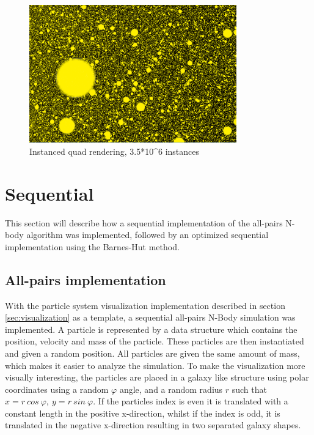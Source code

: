 \begin{figure}[!htpb]
    \centering
    \includegraphics[width=0.8\textwidth]{Method/Figs/OpenGLVis_N=3500000.png}
    \caption{Instanced quad rendering, 3.5*10^6 instances}
    \label{fig:OpenGLEarlyVis}
\end{figure}


\section{Sequential}

This section will describe how a sequential implementation of the all-pairs N-body algorithm was implemented, followed by an optimized sequential implementation using the Barnes-Hut method. \cite{barnes1986hierarchical}


\subsection{All-pairs implementation}
With the particle system visualization implementation described in section \ref{sec:visualization} as a template, a sequential all-pairs N-Body simulation was implemented. A particle is represented by a data structure which contains the position, velocity and mass of the particle. These particles are then instantiated and given a random position. All particles are given the same amount of mass, which makes it easier to analyze the simulation. To make the visualization more visually interesting, the particles are placed in a galaxy like structure using polar coordinates using a random $\varphi$ angle, and a random radius $r$ such that $x = r \ cos \ \varphi, \ y = r \ sin \ \varphi$. If the particles index is even it is translated with a constant length in the positive x-direction, whilst if the index is odd, it is translated in the negative x-direction resulting in two separated galaxy shapes.

